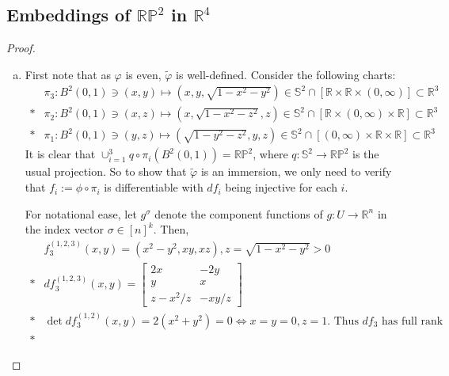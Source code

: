 
{

\newcommand{\SP}{\mathbb{S}^2} %
\newcommand{\RP}{\mathbb{RP}^2} %



\subsection{Embeddings of $\RP$ in $\mathbb{R}^4$}


\begin{proof}
\begin{enumerate}[(a)]
	\item
	First note that as $\varphi$ is even, $\tilde{\varphi}$ is well-defined. Consider the following charts:
	\begin{align*}
		& \pi_3: B^2(0,1) \ni (x,y) \mapsto (x,y,\sqrt{1-x^2-y^2})
		\in \SP \cap \left[\mathbb{R} \times \mathbb{R} \times (0,\infty)\right]
		\subset \mathbb{R}^3 \\*
		& \pi_2: B^2(0,1) \ni (x,z) \mapsto (x,\sqrt{1-x^2-z^2},z)
		\in \SP \cap \left[\mathbb{R} \times (0,\infty) \times \mathbb{R}\right]
		\subset \mathbb{R}^3 \\*
		& \pi_1: B^2(0,1) \ni (y,z) \mapsto (\sqrt{1-y^2-z^2},y,z)
		\in \SP \cap \left[(0,\infty) \times \mathbb{R} \times \mathbb{R}\right]
		\subset \mathbb{R}^3
	\end{align*}
	It is clear that ${\cup_{i=1}^3 q \circ \pi_i (B^2(0,1)) = \RP}$, where ${q:\SP \rightarrow \RP}$ is the usual projection. So to show that $\tilde{\varphi}$ is an immersion, we only need to verify that ${f_i:=\phi \circ \pi_i}$ is differentiable with $d f_i$ being injective for each $i$.
	\par
	For notational ease, let $g^\sigma$ denote the component functions of ${g:U \rightarrow \mathbb{R}^n}$ in the index vector $\sigma \in [n]^k$. Then,
	\begin{align*}
		& f_3^{(1,2,3)}(x,y)=(x^2-y^2,xy,xz), z=\sqrt{1-x^2-y^2}>0 \\*
		& d f_3^{(1,2,3)}(x,y)=
		\begin{bmatrix} 2x & -2y \\ y & x \\ z-x^2/z & -xy/z \end{bmatrix} \\*
		& \det d f_3^{(1,2)}(x,y) = 2(x^2+y^2) = 0 \iff x=y=0,z=1. \textrm{ Thus } d f_3 \textrm{ has full rank} \\*

\end{align*}
\end{enumerate}
\end{proof}}
